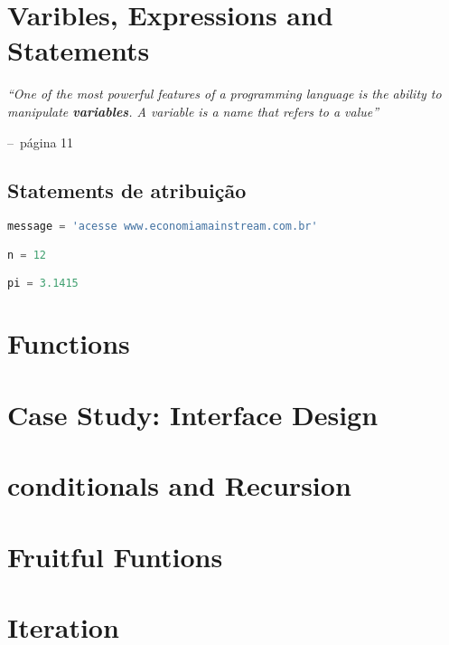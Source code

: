 \documentclass[a4paper,11pt]{book}
\makeatletter
\newenvironment{chapquote}[2][2em]
  {\setlength{\@tempdima}{#1}%
   \def\chapquote@author{#2}%
   \parshape 1 \@tempdima \dimexpr\textwidth-2\@tempdima\relax%
   \itshape}
  {\par\normalfont\hfill--\ \chapquote@author\hspace*{\@tempdima}\par\bigskip}
\makeatother
\begin{document}
\chapter{Varibles, Expressions and Statements}

\begin{chapquote}{página 11}
	``One of the most powerful features of a programming language is the ability to manipulate \textbf{variables}. A variable is a name that refers to a value''
\end{chapquote}

\section{Statements de atribuição}
\begin{lstlisting}[language=Python, caption=Atribuições para diferentes classes]
message = 'acesse www.economiamainstream.com.br'

n = 12

pi = 3.1415
\end{lstlisting}











\chapter{Functions}
\chapter{Case Study: Interface Design}
\chapter{conditionals and Recursion}
\chapter{Fruitful Funtions}
\chapter{Iteration}
\end{document}

